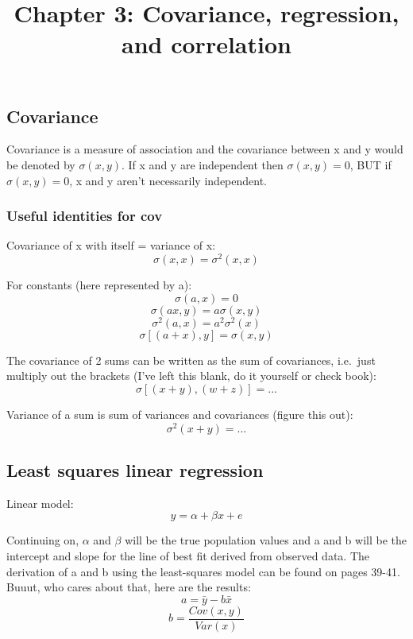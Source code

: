\documentclass[
]{article}
\title{Chapter 3: Covariance, regression, and correlation}
\author{}
\date{\vspace{-2.5em}}
\begin{document}
\maketitle

\hypertarget{covariance}{%
\subsection{Covariance}\label{covariance}}

Covariance is a measure of association and the covariance between x and
y would be denoted by \(\sigma(x, y)\). If x and y are independent then
\(\sigma(x, y) = 0\), BUT if \(\sigma(x, y) = 0\), x and y aren't
necessarily independent.

\hypertarget{useful-identities-for-cov}{%
\subsubsection{Useful identities for
cov}\label{useful-identities-for-cov}}

Covariance of x with itself = variance of x:
\[\sigma(x, x) = \sigma^2(x, x)\]

For constants (here represented by a): \[\sigma(a, x) = 0\]
\[\sigma(ax, y) = a\sigma(x, y)\] \[\sigma^2(a, x) = a^2\sigma^2(x)\]
\[\sigma[(a + x), y] = \sigma(x, y)\]

The covariance of 2 sums can be written as the sum of covariances,
i.e.~just multiply out the brackets (I've left this blank, do it
yourself or check book): \[\sigma[(x + y),(w + z)] = ...\]

Variance of a sum is sum of variances and covariances (figure this out):
\[\sigma^2(x + y) = ...\]

\hypertarget{least-squares-linear-regression}{%
\subsection{Least squares linear
regression}\label{least-squares-linear-regression}}

Linear model: \[y = \alpha + \beta{x} + e\]

Continuing on, \(\alpha\) and \(\beta\) will be the true population
values and a and b will be the intercept and slope for the line of best
fit derived from observed data. The derivation of a and b using the
least-squares model can be found on pages 39-41. Buuut, who cares about
that, here are the results: \[a = \bar{y} - b\bar{x}\]
\[b = \frac{Cov(x, y)} {Var(x)}\]
\end{document}
